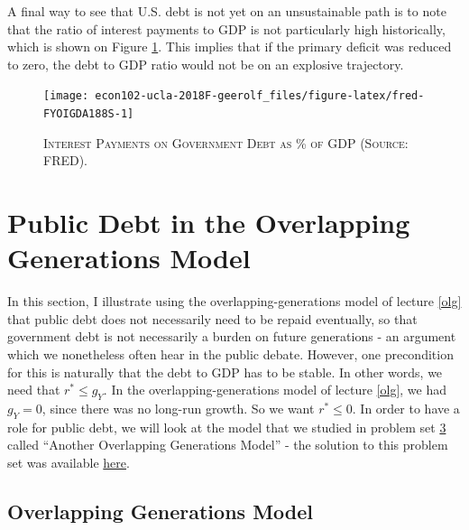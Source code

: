 \documentclass[]{book}
\begin{document}
A final way to see that U.S. debt is not yet on an unsustainable path is
to note that the ratio of interest payments to GDP is not particularly
high historically, which is shown on Figure \ref{fig:fred-FYOIGDA188S}.
This implies that if the primary deficit was reduced to zero, the debt
to GDP ratio would not be on an explosive trajectory.




\begin{figure}

{\centering \texttt{[image: econ102-ucla-2018F-geerolf\_files/figure-latex/fred-FYOIGDA188S-1]} 

}

\caption{\textsc{Interest Payments on Government Debt as
\% of GDP (Source: FRED).}}\label{fig:fred-FYOIGDA188S}
\end{figure}

\section{Public Debt in the Overlapping Generations
Model}\label{public-debt-in-the-overlapping-generations-model}

In this section, I illustrate using the overlapping-generations model of
lecture \ref{olg} that public debt does not necessarily need to be
repaid eventually, so that government debt is not necessarily a burden
on future generations - an argument which we nonetheless often hear in
the public debate. However, one precondition for this is naturally that
the debt to GDP has to be stable. In other words, we need that
\(r^{*} \leq g_Y\). In the overlapping-generations model of lecture
\ref{olg}, we had \(g_Y = 0\), since there was no long-run growth. So we
want \(r^{*} \leq 0\). In order to have a role for public debt, we will
look at the model that we studied in problem set
\protect\hyperlink{pset3}{3} called ``Another Overlapping Generations
Model'' - the solution to this problem set was available
\protect\hyperlink{pset3-sol}{here}.

\subsection{Overlapping Generations
Model}\label{overlapping-generations-model}
\end{document}
